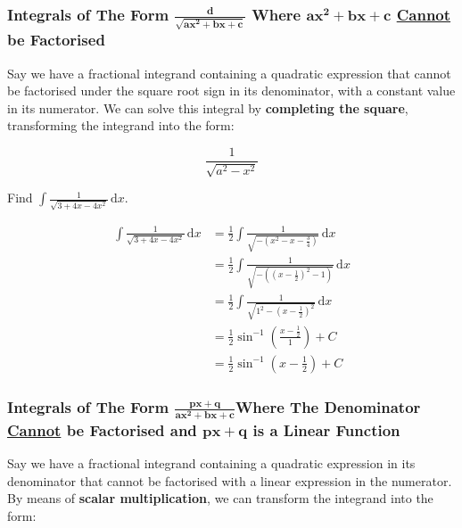 \documentclass[11pt,a4paper]{book}
\begin{document}
\newpage

\subsubsection{Integrals of The Form $\boldsymbol{\frac{d}{\sqrt{ax^{2}+bx+c}}}$
Where $\boldsymbol{ax^{2}+bx+c}$ \uline{Cannot} be Factorised}

Say we have a fractional integrand containing a quadratic expression
that cannot be factorised under the square root sign in its denominator,
with a constant value in its numerator. We can solve this integral
by \textbf{completing the square}, transforming the integrand into
the form:

\[
\frac{1}{\sqrt{a^{2}-x^{2}}}
\]

\begin{example}

Find ${\displaystyle \int\frac{1}{\sqrt{3+4x-4x^{2}}}\, \mathrm{d}x}$.

\medskip

\Solution

\begin{align*}
{\displaystyle \int\frac{1}{\sqrt{3+4x-4x^{2}}}\, \mathrm{d}x} & =\frac{1}{2}\int\frac{1}{\sqrt{-(x^{2}-x-\frac{3}{4})}}\, \mathrm{d}x\\
 & =\frac{1}{2}\int\frac{1}{\sqrt{-((x-\frac{1}{2})^{2}-1)}}\, \mathrm{d}x\\
 & =\frac{1}{2}\int\frac{1}{\sqrt{1^{2}-(x-\frac{1}{2})^{2}}}\, \mathrm{d}x\\
 & =\frac{1}{2}\sin^{-1}\left(\frac{x-\frac{1}{2}}{1}\right)+C\\
 & =\frac{1}{2}\sin^{-1}\left(x-\frac{1}{2}\right)+C
\end{align*}

\end{example}

\newpage{}

\subsubsection{Integrals of The Form $\boldsymbol{\frac{px+q}{ax^{2}+bx+c}}$Where
The Denominator \uline{Cannot} be Factorised and $\boldsymbol{px+q}$
is a Linear Function}

Say we have a fractional integrand containing a quadratic expression
in its denominator that cannot be factorised with a linear expression
in the numerator. By means of\textbf{ scalar multiplication}, we can
transform the integrand into the form:
\end{document}
